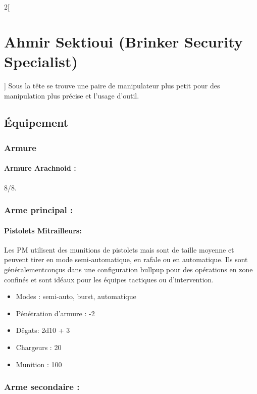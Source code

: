 \documentclass[a4paper,9pt]{article}
\begin{document}
\begin{multicols}{2}[\section*{Ahmir Sektioui (Brinker Security Specialist)}]
   Sous la tête se trouve une paire de manipulateur plus petit pour des manipulation
   plus précise et l'usage d'outil.

   \subsection*{Équipement}

   \subsubsection*{Armure}

   \paragraph{Armure Arachnoid :} 8/8. 

   \subsubsection*{Arme principal :}

   \paragraph{Pistolets Mitrailleurs:} Les PM utilisent des munitions de pistolets
   mais sont de taille moyenne et peuvent tirer en mode semi-automatique, en
   rafale ou en automatique. Ils sont généralementconçus dans une configuration
   bullpup pour des opérations en zone confinés et sont idéaux pour les équipes
   tactiques ou d'intervention.

   \begin{itemize}
      \item Modes : semi-auto, burst, automatique
      \item Pénétration d'armure : -2
      \item Dêgats: 2d10 + 3
      \item Chargeurs : 20
      \item Munition : 100
   \end{itemize}

   \subsubsection*{Arme secondaire :}


\end{multicols}
\end{document}

